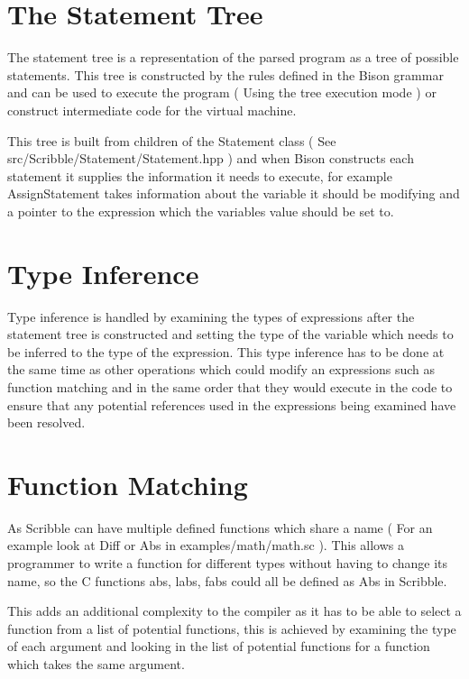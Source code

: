 \documentclass[]{final_report}
\begin{document}
\section{The Statement Tree}

The statement tree is a representation of the parsed program as a tree of possible statements. This tree is constructed by the rules defined in the Bison grammar and can be used to execute the program ( Using the tree execution mode ) or construct intermediate code for the virtual machine.

This tree is built from children of the Statement class ( See src/Scribble/Statement/Statement.hpp ) and when Bison constructs each statement it supplies the information it needs to execute, for example AssignStatement takes information about the variable it should be modifying and a pointer to the expression which the variables value should be set to.

\section{Type Inference}

Type inference is handled by examining the types of expressions after the statement tree is constructed and setting the type of the variable which needs to be inferred to the type of the expression. This type inference has to be done at the same time as other operations which could modify an expressions such as function matching and in the same order that they would execute in the code to ensure that any potential references used in the expressions being examined have been resolved.

\section{Function Matching}

As Scribble can have multiple defined functions which share a name ( For an example look at Diff or Abs in examples/math/math.sc ). This allows a programmer to write a function for different types without having to change its name, so the C functions abs, labs, fabs could all be defined as Abs in Scribble.

This adds an additional complexity to the compiler as it has to be able to select a function from a list of potential functions, this is achieved by examining the type of each argument and looking in the list of potential functions for a function which takes the same argument. 
\end{document}
